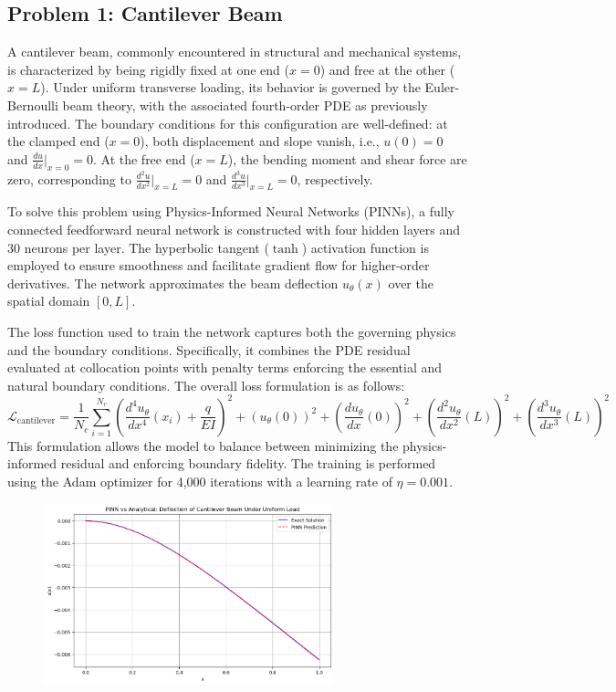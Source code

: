 \documentclass[12pt]{article}
\begin{document}
\subsection{Problem 1: Cantilever Beam}

A cantilever beam, commonly encountered in structural and mechanical systems, is characterized by being rigidly fixed at one end ($x=0$) and free at the other ($x=L$). Under uniform transverse loading, its behavior is governed by the Euler-Bernoulli beam theory, with the associated fourth-order PDE as previously introduced. The boundary conditions for this configuration are well-defined: at the clamped end ($x=0$), both displacement and slope vanish, i.e., $u(0) = 0$ and $\frac{du}{dx}|_{x=0} = 0$. At the free end ($x=L$), the bending moment and shear force are zero, corresponding to $\frac{d^2u}{dx^2}|_{x=L} = 0$ and $\frac{d^3u}{dx^3}|_{x=L} = 0$, respectively.

To solve this problem using Physics-Informed Neural Networks (PINNs), a fully connected feedforward neural network is constructed with four hidden layers and 30 neurons per layer. The hyperbolic tangent ($\tanh$) activation function is employed to ensure smoothness and facilitate gradient flow for higher-order derivatives. The network approximates the beam deflection $u_\theta(x)$ over the spatial domain $[0,L]$.

The loss function used to train the network captures both the governing physics and the boundary conditions. Specifically, it combines the PDE residual evaluated at collocation points with penalty terms enforcing the essential and natural boundary conditions. The overall loss formulation is as follows:
\[
\mathcal{L}_{\text{cantilever}} = \frac{1}{N_c}\sum_{i=1}^{N_c}\left(\frac{d^4u_{\theta}}{dx^4}(x_i) + \frac{q}{EI}\right)^2 + 
\left(u_{\theta}(0)\right)^2 + \left(\frac{du_{\theta}}{dx}(0)\right)^2 + 
\left(\frac{d^2u_{\theta}}{dx^2}(L)\right)^2 + \left(\frac{d^3u_{\theta}}{dx^3}(L)\right)^2
\]
This formulation allows the model to balance between minimizing the physics-informed residual and enforcing boundary fidelity. The training is performed using the Adam optimizer for 4,000 iterations with a learning rate of $\eta=0.001$.

\begin{figure}[htbp]
    \centering
    \includegraphics[width=0.75\textwidth]{cantilever_results.png}
    \caption{}
    \label{fig:cantilever}
\end{figure}
\end{document}
